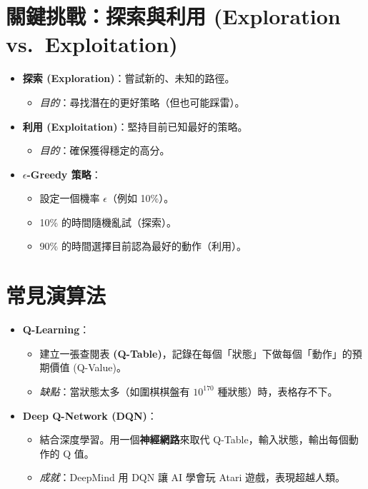 \documentclass[
  letterpaper,
  DIV=11,
  numbers=noendperiod]{scrreprt}
\providecommand{\tightlist}{%
  \setlength{\itemsep}{0pt}\setlength{\parskip}{0pt}}
\begin{document}
\section{關鍵挑戰：探索與利用 (Exploration
vs.~Exploitation)}\label{ux95dcux9375ux6311ux6230ux63a2ux7d22ux8207ux5229ux7528-exploration-vs.-exploitation}

\begin{itemize}
\tightlist
\item
  \textbf{探索 (Exploration)}：嘗試新的、未知的路徑。

  \begin{itemize}
  \tightlist
  \item
    \emph{目的}：尋找潛在的更好策略（但也可能踩雷）。
  \end{itemize}
\item
  \textbf{利用 (Exploitation)}：堅持目前已知最好的策略。

  \begin{itemize}
  \tightlist
  \item
    \emph{目的}：確保獲得穩定的高分。
  \end{itemize}
\item
  \textbf{\(\epsilon\)-Greedy 策略}：

  \begin{itemize}
  \tightlist
  \item
    設定一個機率 \(\epsilon\)（例如 10\%）。
  \item
    10\% 的時間隨機亂試（探索）。
  \item
    90\% 的時間選擇目前認為最好的動作（利用）。
  \end{itemize}
\end{itemize}

\section{常見演算法}\label{sec-rl-algorithms}

\begin{itemize}
\tightlist
\item
  \textbf{Q-Learning}：

  \begin{itemize}
  \tightlist
  \item
    建立一張查閱表
    \textbf{(Q-Table)}，記錄在每個「狀態」下做每個「動作」的預期價值
    (Q-Value)。
  \item
    \emph{缺點}：當狀態太多（如圍棋棋盤有 \(10^{170}\)
    種狀態）時，表格存不下。
  \end{itemize}
\item
  \textbf{Deep Q-Network (DQN)}：

  \begin{itemize}
  \tightlist
  \item
    結合深度學習。用一個\textbf{神經網路}來取代
    Q-Table，輸入狀態，輸出每個動作的 Q 值。
  \item
    \emph{成就}：DeepMind 用 DQN 讓 AI 學會玩 Atari 遊戲，表現超越人類。
  \end{itemize}
\end{itemize}
\end{document}
